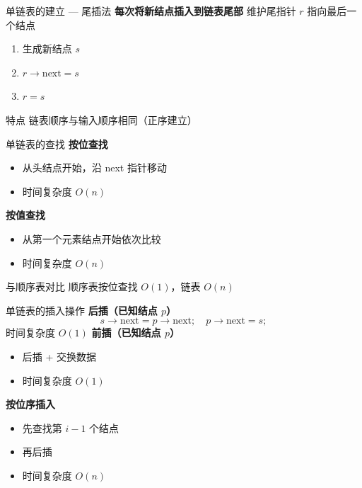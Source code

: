 \documentclass[10pt, aspectratio=169]{beamer}
\begin{document}
\begin{frame}{单链表的建立 --- 尾插法}
    \textbf{每次将新结点插入到链表尾部}
    \vspace{0.5em}
    维护尾指针 $r$ 指向最后一个结点
    \vspace{0.5em}
    \begin{enumerate}
        \item 生成新结点 $s$
        \item $r \to \text{next} = s$
        \item $r = s$
    \end{enumerate}
    \vspace{0.5em}
    \begin{block}{特点}
        链表顺序与输入顺序相同（正序建立）
    \end{block}
\end{frame}

\begin{frame}{单链表的查找}
    \textbf{按位查找}
    \begin{itemize}
        \item 从头结点开始，沿 next 指针移动
        \item 时间复杂度 $O(n)$
    \end{itemize}
    \vspace{0.5em}
    \textbf{按值查找}
    \begin{itemize}
        \item 从第一个元素结点开始依次比较
        \item 时间复杂度 $O(n)$
    \end{itemize}
    \vspace{0.5em}
    \begin{alertblock}{与顺序表对比}
        顺序表按位查找 $O(1)$，链表 $O(n)$
    \end{alertblock}
\end{frame}

\begin{frame}{单链表的插入操作}
    \textbf{后插（已知结点 $p$）}
    \[
    s \to \text{next} = p \to \text{next};\quad p \to \text{next} = s;
    \]
    时间复杂度 $O(1)$
    \vspace{0.5em}
    \textbf{前插（已知结点 $p$）}
    \begin{itemize}
        \item 后插 + 交换数据
        \item 时间复杂度 $O(1)$
    \end{itemize}
    \vspace{0.5em}
    \textbf{按位序插入}
    \begin{itemize}
        \item 先查找第 $i-1$ 个结点
        \item 再后插
        \item 时间复杂度 $O(n)$
    \end{itemize}
\end{frame}
\end{document}
